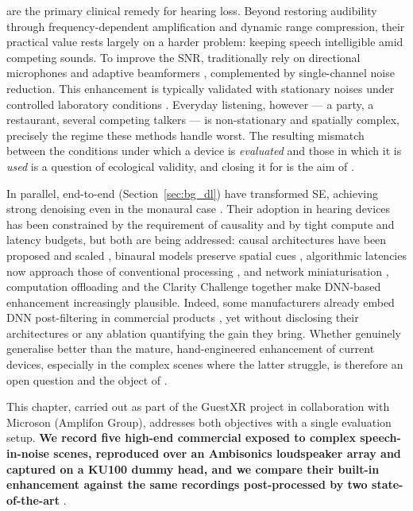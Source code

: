  are the primary clinical remedy for hearing
loss. Beyond restoring audibility through frequency-dependent amplification
and dynamic range compression, their practical value rests largely on a
harder problem: keeping speech intelligible amid competing sounds. To improve
the \acrshort{SNR},  traditionally rely on directional microphones
\citep{ricketts1999} and adaptive beamformers
\citep{luo2002adaptive, gode2022}, complemented by single-channel
noise reduction. This enhancement is typically validated with stationary
noises under controlled laboratory conditions \citep{IEC6011816}. Everyday
listening, however --- a party, a restaurant, several competing talkers --- is
non-stationary and spatially complex, precisely the regime these methods
handle worst. The resulting mismatch between the conditions under which a
device is \emph{evaluated} and those in which it is \emph{used} is a question
of ecological validity, and closing it for  is the aim of
.

In parallel, end-to-end  (Section~\ref{sec:bg_dl}) have
transformed \acrshort{SE}, achieving strong denoising even in the
monaural case \citep{reddy2021icassp}. Their adoption in hearing devices has
been constrained by the requirement of causality and by tight compute and
latency budgets, but both are being addressed: causal architectures have been
proposed \citep{tzinis2020sudo} and scaled \citep{ali2023scaling}, binaural
models preserve spatial cues \citep{han2020}, algorithmic latencies now
approach those of conventional  processing
\citep{wang2023neural, stone2008delays}, and network miniaturisation
\citep{banbury2021micronets}, computation offloading \citep{sun2020supervised}
and the Clarity Challenge \citep{clarity} together make \acrshort{DNN}-based
 enhancement increasingly plausible. Indeed, some manufacturers
already embed \acrshort{DNN} post-filtering in commercial products
\citep{andersen2021, oticon2, oticon3}, yet without disclosing their
architectures or any ablation quantifying the gain they bring. Whether
 genuinely generalise better than the mature, hand-engineered
enhancement of current devices, especially in the complex scenes where the
latter struggle, is therefore an open question and the object of
.

This chapter, carried out as part of the GuestXR project in collaboration with Microson (Amplifon Group),
addresses both objectives with a single evaluation setup. \textbf{We
record five high-end commercial  exposed to complex
speech-in-noise scenes, reproduced over an Ambisonics loudspeaker array and captured on a \acrfull{KU100} dummy head,
and we compare their built-in enhancement against the same recordings
post-processed by two state-of-the-art }. 

